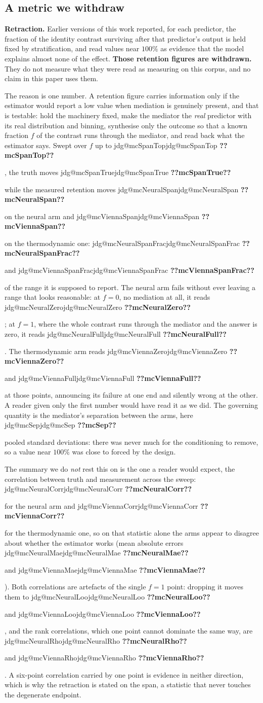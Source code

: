 \documentclass[11pt]{article}
\makeatletter
\newcommand{\jdg}[1]{%
  \ifcsname jdg@#1\endcsname\csname jdg@#1\endcsname
  \else\textbf{??#1??}\PackageError{nm}{undefined measured quantity #1}{}\fi}
\makeatother
\begin{document}
\subsection{A metric we withdraw}
\label{sec:withdrawal}

\begin{withdrawbox}
\textbf{Retraction.} Earlier versions of this work reported, for each predictor, the fraction of
the identity contrast surviving after that predictor's output is held fixed by stratification, and
read values near $100\%$ as evidence that the model explains almost none of the effect.
\textbf{Those retention figures are withdrawn.} They do not measure what they were read as
measuring on this corpus, and no claim in this paper uses them.
\end{withdrawbox}

\noindent The reason is one number. A retention figure carries information only if the estimator
would report a low value when mediation is genuinely present, and that is testable: hold the
machinery fixed, make the mediator the \emph{real} predictor with its real distribution and
binning, synthesise only the outcome so that a known fraction $f$ of the contrast runs through the
mediator, and read back what the estimator says. Swept over $f$ up to \jdg{mcSpanTop}, the truth
moves \jdg{mcSpanTrue} while the measured retention moves \jdg{mcNeuralSpan} on the neural arm and
\jdg{mcViennaSpan} on the thermodynamic one: \jdg{mcNeuralSpanFrac} and \jdg{mcViennaSpanFrac}
of the range it is supposed to report. The neural arm fails without ever leaving a range that looks reasonable: at $f=0$, no mediation at
all, it reads \jdg{mcNeuralZero}; at $f=1$, where the whole contrast runs through the mediator and
the answer is zero, it reads \jdg{mcNeuralFull}. The
thermodynamic arm reads \jdg{mcViennaZero} and \jdg{mcViennaFull} at those points, announcing its
failure at one end and silently wrong at the other. A reader given only the first number would
have read it as we did. The governing quantity is the mediator's separation between the arms, here \jdg{mcSep} pooled
standard deviations: there was never much for the conditioning to remove, so a value near $100\%$
was close to forced by the design.

The summary we do \emph{not} rest this on is the one a reader would expect, the correlation between
truth and measurement across the sweep: \jdg{mcNeuralCorr} for the neural arm and \jdg{mcViennaCorr}
for the thermodynamic one, so on that statistic alone the arms appear to disagree about whether the
estimator works (mean absolute errors \jdg{mcNeuralMae} and \jdg{mcViennaMae}). Both correlations are artefacts of the single $f=1$ point: dropping it moves
them to \jdg{mcNeuralLoo} and \jdg{mcViennaLoo}, and the rank correlations, which one point cannot
dominate the same way, are \jdg{mcNeuralRho} and \jdg{mcViennaRho}. A six-point correlation
carried by one point is evidence in neither direction, which is why the retraction is stated on
the span, a statistic that never touches the degenerate endpoint.
\end{document}

